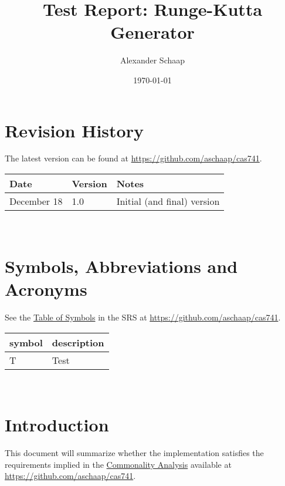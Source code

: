\documentclass[12pt, titlepage]{article}
\begin{document}
\title{Test Report: Runge-Kutta Generator} 
\author{Alexander Schaap}
\date{\today}
	
\maketitle


\section{Revision History}

The latest version can be found at \url{https://github.com/aschaap/cas741}.\\

\begin{tabularx}{\textwidth}{p{3cm}p{2cm}X}
\toprule {\bf Date} & {\bf Version} & {\bf Notes}\\
\midrule
December 18 & 1.0 & Initial (and final) version\\
\bottomrule
\end{tabularx}

~\newpage

\section{Symbols, Abbreviations and Acronyms}
See the \href{../SRS/CA.pdf#ssec:symbols}{Table of Symbols} in the SRS at 
\url{https://github.com/aschaap/cas741}.
\renewcommand{\arraystretch}{1.2}
\begin{tabular}{l l} 
  \toprule		
  \textbf{symbol} & \textbf{description}\\
  \midrule 
  T & Test\\
  \bottomrule
\end{tabular}\\


\newpage

\tableofcontents

%

\newpage


\section{Introduction}
This document will summarize whether the implementation satisfies the 
requirements implied in the \href{../SRS/CA.pdf}{Commonality Analysis} 
available at \url{https://github.com/aschaap/cas741}.
\end{document}
